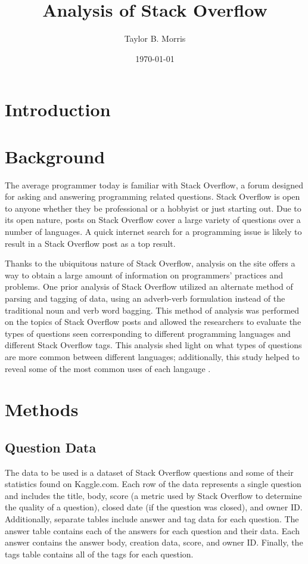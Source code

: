 \documentclass{article}
\author{Taylor B. Morris}
\title{Analysis of Stack Overflow}
\date{\today}
\begin{document}
\maketitle
\begin{abstract}
\end{abstract}
\section{Introduction}


\section{Background}
The average programmer today is familiar with Stack Overflow, a forum
designed for asking and answering programming related questions. Stack
Overflow is open to anyone whether they be professional or a hobbyist or
just starting out. Due to its open nature, posts on Stack Overflow cover
a large variety of questions over a number of languages. A quick internet
search for a programming issue is likely to result in a Stack Overflow post
as a top result.

Thanks to the ubiquitous nature of Stack Overflow, analysis on the site
offers a way to obtain a large amount of information on programmers'
practices and problems. One prior analysis of Stack Overflow utilized an 
alternate method of parsing and tagging of data, using an adverb-verb 
formulation instead of the traditional noun and verb word bagging. This 
method of analysis was performed on the topics of Stack Overflow posts and 
allowed the researchers to evaluate the types of questions seen 
corresponding to different programming languages and different Stack 
Overflow tags. This analysis shed light on what types of questions are more 
common between different languages; additionally, this study helped to 
reveal some of the most common uses of each langauge 
\cite{allamanis2013and}.

\section{Methods}
\subsection{Question Data}
The data to be used is a dataset of Stack Overflow questions and some of
their statistics found on Kaggle.com. Each row of the data represents a
single question and includes the title, body, score (a metric used by Stack
Overflow to determine the quality of a question), closed date (if the
question was closed), and owner ID. Additionally, separate tables include
answer and tag data for each question.
The answer table contains each of the answers for each question and their
data. Each answer contains the answer body, creation data, score, and owner
ID. Finally, the tags table contains all of the tags for each question. 
\end{document}
